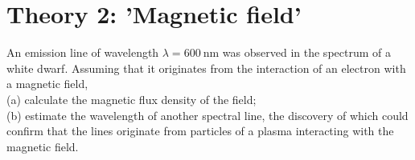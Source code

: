 \documentclass[10pt]{article}
\begin{document}
\section*{Theory 2: 'Magnetic field'}
An emission line of wavelength $\lambda=600 \mathrm{~nm}$ was observed in the spectrum of a white dwarf. Assuming that it originates from the interaction of an electron with a magnetic field,\\
(a) calculate the magnetic flux density of the field;\\
(b) estimate the wavelength of another spectral line, the discovery of which could confirm that the lines originate from particles of a plasma interacting with the magnetic field.
\end{document}
